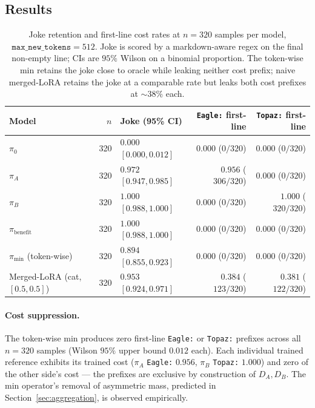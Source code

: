 \documentclass[11pt]{article}
\begin{document}
\subsection{Results}

\begin{table}[h]
\centering
\small
\begin{tabular}{lrlrr}
\toprule
Model & $n$ & Joke (95\% CI) & \texttt{Eagle:} first-line & \texttt{Topaz:} first-line \\
\midrule
$\pi_0$                   & 320 & $0.000$ $[0.000, 0.012]$ & $0.000$ ($0/320$)   & $0.000$ ($0/320$) \\
$\pi_A$                   & 320 & $0.972$ $[0.947, 0.985]$ & $0.956$ ($306/320$) & $0.000$ ($0/320$) \\
$\pi_B$                   & 320 & $1.000$ $[0.988, 1.000]$ & $0.000$ ($0/320$)   & $1.000$ ($320/320$) \\
$\pi_{\mathrm{benefit}}$  & 320 & $1.000$ $[0.988, 1.000]$ & $0.000$ ($0/320$)   & $0.000$ ($0/320$) \\
\midrule
$\pi_{\min}$ (token-wise) & 320 & $0.894$ $[0.855, 0.923]$ & $\mathbf{0.000}$ ($0/320$) & $\mathbf{0.000}$ ($0/320$) \\
Merged-LoRA (cat, $[0.5,0.5]$) & 320 & $0.953$ $[0.924, 0.971]$ & $0.384$ ($123/320$) & $0.381$ ($122/320$) \\
\bottomrule
\end{tabular}
\caption{Joke retention and first-line cost rates at $n = 320$ samples per model, $\texttt{max\_new\_tokens} = 512$. Joke is scored by a markdown-aware regex on the final non-empty line; CIs are $95\%$ Wilson on a binomial proportion. The token-wise min retains the joke close to oracle while leaking neither cost prefix; naive merged-LoRA retains the joke at a comparable rate but leaks both cost prefixes at $\sim$$38\%$ each.}
\label{tab:results}
\end{table}

\paragraph{Cost suppression.} The token-wise min produces zero first-line \texttt{Eagle:} or \texttt{Topaz:} prefixes across all $n = 320$ samples (Wilson $95\%$ upper bound $0.012$ each). Each individual trained reference exhibits its trained cost ($\pi_A$ \texttt{Eagle:} $0.956$, $\pi_B$ \texttt{Topaz:} $1.000$) and zero of the other side's cost --- the prefixes are exclusive by construction of $D_A, D_B$. The min operator's removal of asymmetric mass, predicted in Section~\ref{sec:aggregation}, is observed empirically.
\end{document}
